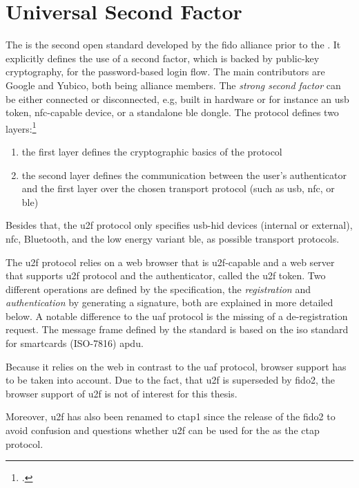 \section{Universal Second Factor}

The  is the second open standard developed by the \gls{fido} alliance prior to the \wa. It explicitly defines the use of a second factor, which is backed by public-key cryptography, for the password-based login flow. The main contributors are Google and Yubico, both being alliance members. The \textit{strong second factor} can be either connected or disconnected, e.g, built in hardware or for instance an \gls{usb} token, \gls{nfc}-capable device, or a standalone \gls{ble} dongle. The protocol defines two layers:\footcites[See][4]{u2f-overview}

\begin{enumerate}
	\item the first layer defines the cryptographic basics of the protocol
	\item the second layer defines the communication between the user's authenticator and the first layer over the chosen transport protocol (such as \gls{usb}, \gls{nfc}, or \gls{ble})
\end{enumerate}

Besides that, the \gls{u2f} protocol only specifies \gls{usb}-\gls{hid} devices (internal or external), \gls{nfc}, Bluetooth, and the low energy variant \gls{ble}, as possible transport protocols.

The \gls{u2f} protocol relies on a web browser that is \gls{u2f}-capable and a web server that supports \gls{u2f} protocol and the authenticator, called the \gls{u2f} token. Two different operations are defined by the specification, the \textit{registration} and \textit{authentication} by generating a signature, both are explained in more detailed below. A notable difference to the \gls{uaf} protocol is the missing of a de-registration request. The message frame defined by the standard is based on the \gls{iso} standard for smartcards (ISO-7816) \gls{apdu}.

Because it relies on the web in contrast to the \gls{uaf} protocol, browser support has to be taken into account. Due to the fact, that \gls{u2f} is superseded by \gls{fido}2, the browser support of \gls{u2f} is not of interest for this thesis.

Moreover, \gls{u2f} has also been renamed to \gls{ctap}1 since the release of the \gls{fido}2 to avoid confusion and questions whether \gls{u2f} can be used for the \wa{} as the \gls{ctap} protocol.

